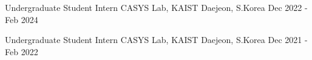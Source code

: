 \begin{cventries}

  \cventry
    {Undergraduate Student Intern} %
    {CASYS Lab, KAIST} %
    {Daejeon, S.Korea} %
    {Dec 2022 - Feb 2024} %
    {  }

  \cventry
    {Undergraduate Student Intern} %
    {CASYS Lab, KAIST} %
    {Daejeon, S.Korea} %
    {Dec 2021 - Feb 2022} %
    {  }

\end{cventries}
